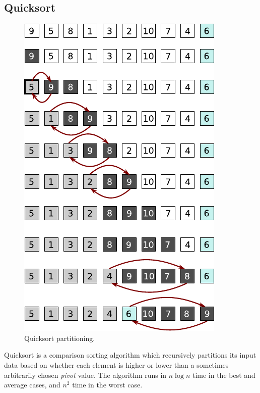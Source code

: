 \documentclass[12pt, a4paper]{article}
\begin{document}
\subsection{Quicksort}

\begin{figure}
    \centering
    \includegraphics{quicksort.pdf}
    \caption{\label{fig:quicksort_1}Quicksort partitioning.}
\end{figure}

Quicksort is a comparison sorting algorithm which recursively partitions its input data based on whether each element is higher or lower than a sometimes arbitrarily chosen \emph{pivot} value. The algorithm runs in $n\log n$ time in the best and average cases, and $n^{2}$ time in the worst case.
\end{document}

